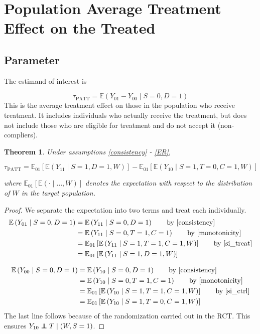 \documentclass{article}
\newcommand{\ex}{\mathbb{E}} %
\newcommand\independent{\protect\mathpalette{\protect\independenT}{\perp}}
\def\independenT#1#2{\mathrel{\rlap{$#1#2$}\mkern2mu{#1#2}}}
\theoremstyle{plain}
\newtheorem{theorem}{Theorem}
\begin{document}
\section{Population Average Treatment Effect on the Treated}
\subsection{Parameter}
The estimand of interest is 

\begin{equation}
\tau_{\text{PATT}} = \ex\left( Y_{01} - Y_{00} \mid S=0, D=1\right)
\end{equation}
This is the average treatment effect on those in the population who receive treatment.  It includes individuals who actually receive the treatment, but does not include those who are eligible for treatment and do not accept it (non-compliers).

\begin{theorem}\label{thm1}
Under assumptions \eqref{consistency} - \eqref{ER},

$$\tau_{\text{PATT}} = \ex_{01}\left[  \ex\left(Y_{11} \mid S=1, D=1, W\right)\right]
-\ex_{01}\left[  \ex\left(Y_{10} \mid S=1, T=0, C=1, W\right) \right] $$

where $\ex_{01}\left[\ex(\cdot \mid\dots, W)\right]$ denotes the expectation with respect to the distribution of $W$ in the target population.  
\end{theorem}





\begin{proof}
We separate the expectation into two terms and treat each individually.
\begin{align*}
\ex\left(Y_{01} \mid S=0,D=1\right) &= \ex\left(Y_{11} \mid S=0, D=1\right) \tag*{by \eqref{consistency}} \\
&= \ex\left(Y_{11} \mid S=0, T=1, C=1\right) \tag*{by \eqref{monotonicity}} \\
&= \ex_{01}\left[  \ex\left(Y_{11} \mid S=1, T=1, C=1, W\right) \right] \tag*{by \eqref{si_treat}} \\
&= \ex_{01}\left[  \ex\left(Y_{11} \mid S=1, D=1, W\right)\right]
\end{align*}


\begin{align*}
\ex\left(Y_{00} \mid S=0, D=1\right) &= \ex\left(Y_{10} \mid S=0, D=1\right) \tag*{by \eqref{consistency}} \\
&= \ex\left(Y_{10} \mid S=0, T=1, C=1\right) \tag*{by \eqref{monotonicity}} \\
&= \ex_{01}\left[  \ex\left(Y_{10} \mid S=1, T=1, C=1, W\right) \right] \tag*{by \eqref{si_ctrl}} \\
&= \ex_{01}\left[  \ex\left(Y_{10} \mid S=1, T=0, C=1, W\right) \right] \\
\end{align*}
The last line follows because of the randomization carried out in the RCT.  This ensures $Y_{10} \independent T \mid (W, S=1)$.
\end{proof}
\end{document}
